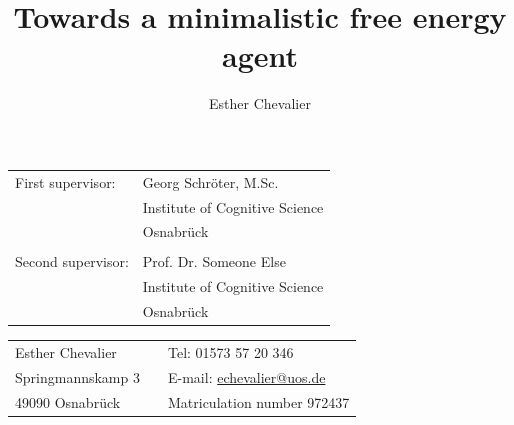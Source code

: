 \documentclass[11pt,
  paper=a4,
  bibliography=totocnumbered,
	captions=tableheading,
	BCOR=10mm
]{scrreprt}
\title{Towards a minimalistic free energy agent}
\author{Esther Chevalier}
\theoremstyle{definition}
\begin{document}
\begin{titlepage}

	\vspace{1,5cm}
	\vspace{1cm}

	\begin{tabular}{ll}
		First supervisor:  & Georg Schröter, M.Sc.          \\
		                   & Institute of Cognitive Science                  \\
		                   & Osnabrück                       \\\\
		Second supervisor: & Prof. Dr. Someone Else         \\
		                   & Institute of Cognitive Science \\
		                   & Osnabrück
	\end{tabular}

    \vspace{4cm}
    \begin{tabular}{m{4cm} m{3cm} m{5cm} }
        Esther Chevalier  && Tel: 01573 57 20 346\\
        Springmannskamp 3 && E-mail: \href{mailto:echevalier@uos.de}{echevalier@uos.de}\\
        49090 Osnabrück   && Matriculation number 972437\\

    \end{tabular}


\end{titlepage}
\end{document}
